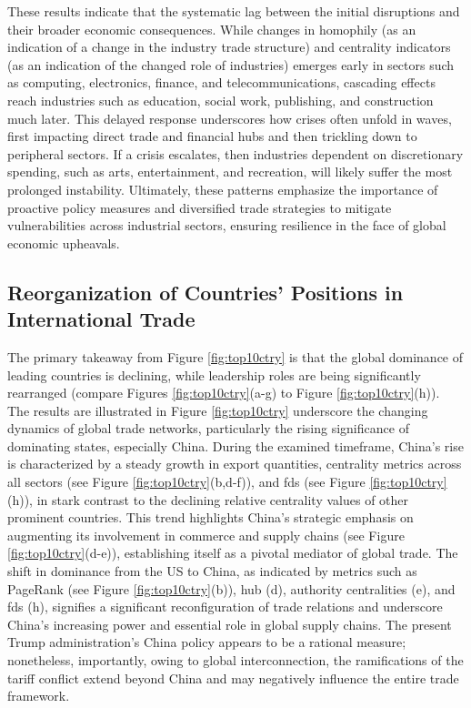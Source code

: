 \documentclass[preprint, 3p,
authoryear]{elsarticle} %
\begin{document}
These results indicate that the systematic lag between the initial
disruptions and their broader economic consequences. While changes in
homophily (as an indication of a change in the industry trade structure)
and centrality indicators (as an indication of the changed role of
industries) emerges early in sectors such as computing, electronics,
finance, and telecommunications, cascading effects reach industries such
as education, social work, publishing, and construction much later. This
delayed response underscores how crises often unfold in waves, first
impacting direct trade and financial hubs and then trickling down to
peripheral sectors. If a crisis escalates, then industries dependent on
discretionary spending, such as arts, entertainment, and recreation,
will likely suffer the most prolonged instability. Ultimately, these
patterns emphasize the importance of proactive policy measures and
diversified trade strategies to mitigate vulnerabilities across
industrial sectors, ensuring resilience in the face of global economic
upheavals.

\subsection{Reorganization of Countries' Positions in International
Trade}\label{reorganization-of-countries-positions-in-international-trade}

The primary takeaway from Figure \ref{fig:top10ctry} is that the global
dominance of leading countries is declining, while leadership roles are
being significantly rearranged (compare Figures \ref{fig:top10ctry}(a-g)
to Figure \ref{fig:top10ctry}(h)). The results are illustrated in Figure
\ref{fig:top10ctry} underscore the changing dynamics of global trade
networks, particularly the rising significance of dominating states,
especially China. During the examined timeframe, China's rise is
characterized by a steady growth in export quantities, centrality
metrics across all sectors (see Figure \ref{fig:top10ctry}(b,d-f)), and
\glspl{fd} (see Figure \ref{fig:top10ctry}(h)), in stark contrast to the
declining relative centrality values of other prominent countries. This
trend highlights China's strategic emphasis on augmenting its
involvement in commerce and supply chains (see Figure
\ref{fig:top10ctry}(d-e)), establishing itself as a pivotal mediator of
global trade. The shift in dominance from the US to China, as indicated
by metrics such as PageRank (see Figure \ref{fig:top10ctry}(b)), hub
(d), authority centralities (e), and \glspl{fd} (h), signifies a
significant reconfiguration of trade relations and underscore China's
increasing power and essential role in global supply chains. The present
Trump administration's China policy appears to be a rational measure;
nonetheless, importantly, owing to global interconnection, the
ramifications of the tariff conflict extend beyond China and may
negatively influence the entire trade framework.
\end{document}
